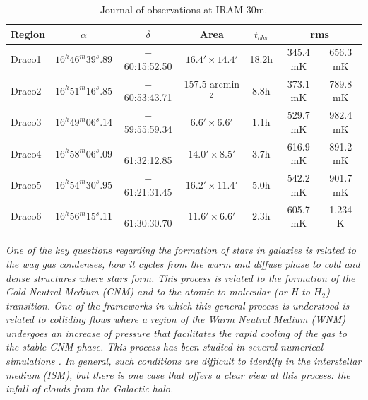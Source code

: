 \documentclass[traditabstract]{aa}
\newcommand{\tfm}[1]{\tablefootmark{#1}}
\begin{document}
\begin{table}[h]
  \centering
  \footnotesize
  \caption{\label{table:rms} Journal of observations at IRAM 30m.}
  \begin{tabular}{lcccccc}
    \hline \hline
    Region &      $\alpha$       &    $\delta$    &        Area         & $t_{obs}$ \tfm{a} & \multicolumn{2}{c}{rms \tfm{b}} \\ \hline 
    Draco1 & $16^h 46^m 39^s.89$ & $+$60:15:52.50 & $16.4'\times 14.4'$ &       18.2h       &    345.4 mK    &    656.3 mK    \\
    Draco2 & $16^h 51^m 16^s.85$ & $+$60:53:43.71 &  157.5 arcmin$^2$   &        8.8h       &    373.1 mK    &    789.8 mK    \\
    Draco3 & $16^h 49^m 06^s.14$ & $+$59:55:59.34 &  $6.6'\times 6.6'$  &        1.1h       &    529.7 mK    &    982.4 mK    \\
    Draco4 & $16^h 58^m 06^s.09$ & $+$61:32:12.85 & $14.0'\times 8.5'$  &        3.7h       &    616.9 mK    &    891.2 mK    \\
    Draco5 & $16^h 54^m 30^s.95$ & $+$61:21:31.45 & $16.2'\times 11.4'$ &        5.0h       &    542.2 mK    &    901.7 mK    \\
    Draco6 & $16^h 56^m 15^s.11$ & $+$61:30:30.70 & $11.6'\times 6.6'$  &        2.3h       &    605.7 mK    &    1.234 K     \\ \hline
  \end{tabular}
\end{table}

\textit{   One of the key questions regarding the formation of stars in galaxies is related to the way gas condenses, how it cycles from the warm and diffuse phase to cold and dense structures where stars form. This process is related to the formation of the Cold Neutral Medium (CNM) and to the atomic-to-molecular (or H-to-$H_2$) transition. 
One of the frameworks in which this general process is understood is related to colliding flows where a region of the Warm Neutral Medium (WNM) undergoes an increase of pressure that facilitates the rapid cooling of the gas to the stable CNM phase. This process has been studied in several numerical simulations \citep{Hennebelle_1999,Audit_2005,Vazquez_2006,Hennebelle_2007,Inoue_2009,Saury_2014}. In general, such conditions are difficult to identify in the interstellar medium (ISM), but there is one case that offers a clear view at this process: the infall of clouds from the Galactic halo.}
\end{document}
